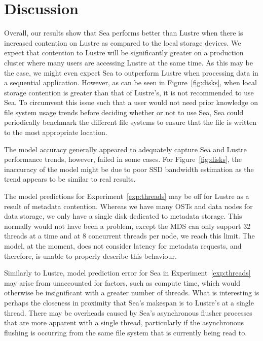 \section{Discussion}
          Overall, our results show that Sea performs better than Lustre when there is 
      increased contention on Lustre as compared to the local storage devices. We  
      expect that contention to Lustre will be significantly greater on a          
      production cluster where many users are accessing Lustre at the same time.   
      As this may be the case, we might even expect Sea to outperform Lustre when  
      processing data in a sequential application. However, as can be seen in      
      Figure~\ref{fig:disks}, when local storage contention is greater than that   
      of Lustre's, it is not recommended to use Sea. To circumvent this issue      
      such that a user would not need prior knowledge on file system usage trends  
      before deciding whether or not to use Sea, Sea could periodically benchmark  
      the different file systems to ensure that the file is written to the most    
      appropriate location.                                                        
                                                                                   
      The model accuracy generally appeared to adequately capture Sea and Lustre   
      performance trends, however, failed in some cases.                           
      For Figure~\ref{fig:disks}, the inaccuracy of the model might be due to poor 
      SSD bandwidth estimation as the trend appears to be similar to real results. 
                                                                                   
      The model predictions for Experiment~\ref{exp:threads} may be off for Lustre as a result
      of metadata contention. Whereas we have many OSTs and data nodes for         
      data storage, we only have a single disk dedicated to metadata storage.      
      This normally would not have been a problem, except the MDS can only support 
      32 threads at a time and at 8 concurrent threads per node, we reach this limit.
      The model, at the moment, does not consider latency for metadata requests, and
      therefore, is unable to properly describe this behaviour.                    
                                                                                   
      Similarly to Lustre, model prediction error for Sea in Experiment~\ref{exp:threads}
      may arise from unaccounted for factors, such as compute time, which would otherwise
      be insignificant with a greater number of threads. What is interesting is perhaps
      the closeness in proximity that Sea's makespan is to Lustre's at a single thread.
      There may be overheads caused by Sea's asynchronous flusher processes that are more
      apparent with a single thread, particularly if the asynchronous flushing is occurring
      from the same file system that is currently being read to.                   
                                                                                   
